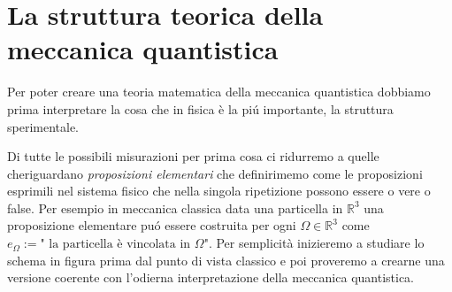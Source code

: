 \section{La struttura teorica della meccanica quantistica}


Per poter creare una teoria matematica della meccanica quantistica dobbiamo prima interpretare la cosa che in fisica è la piú importante, la struttura sperimentale.

\begin{figure}[H]
\begin{center}
 \end{center}
\end{figure}

Di tutte le possibili misurazioni per prima cosa ci ridurremo a quelle cheriguardano \emph{proposizioni elementari }che definirimemo come le proposizioni esprimili nel sistema fisico che nella singola ripetizione possono essere o vere o false. Per esempio in meccanica classica data una particella in $\mathbb{R}^3$ una proposizione elementare puó essere costruita per ogni $\Omega \in \mathbb{R}^3$ come $e_\Omega := \text{" la particella è vincolata in $\Omega$"}$. Per semplicità inizieremo a studiare lo schema in figura prima dal punto di vista classico e poi proveremo a crearne una versione coerente con l'odierna interpretazione della meccanica quantistica. 

